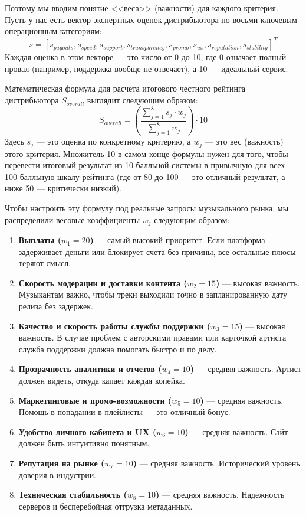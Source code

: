 \documentclass[14pt, a4paper]{extarticle}
\begin{document}
Поэтому мы вводим понятие <<веса>> (важности) для каждого критерия. Пусть у нас есть вектор экспертных оценок дистрибьютора по восьми ключевым операционным категориям:
\begin{equation}\label{scores_vector_simple}
s = [s_{payouts}, s_{speed}, s_{support}, s_{transparency}, s_{promo}, s_{ux}, s_{reputation}, s_{stability}]^T
\end{equation}
Каждая оценка в этом векторе — это число от 0 до 10, где 0 означает полный провал (например, поддержка вообще не отвечает), а 10 — идеальный сервис.

Математическая формула для расчета итогового честного рейтинга дистрибьютора $S_{overall}$ выглядит следующим образом:
\begin{equation}\label{additive_convolution_simple}
S_{overall} = \left( \frac{\sum_{j=1}^{8} s_j \cdot w_j}{\sum_{j=1}^{8} w_j} \right) \cdot 10
\end{equation}
Здесь $s_j$ — это оценка по конкретному критерию, а $w_j$ — это вес (важность) этого критерия. Множитель 10 в самом конце формулы нужен для того, чтобы перевести итоговый результат из 10-балльной системы в привычную для всех 100-балльную шкалу рейтинга (где от 80 до 100 — это отличный результат, а ниже 50 — критически низкий).

Чтобы настроить эту формулу под реальные запросы музыкального рынка, мы распределили весовые коэффициенты $w_j$ следующим образом:
\begin{enumerate}
    \item \textbf{Выплаты ($w_1 = 20$)} — самый высокий приоритет. Если платформа задерживает деньги или блокирует счета без причины, все остальные плюсы теряют смысл.
    \item \textbf{Скорость модерации и доставки контента ($w_2 = 15$)} — высокая важность. Музыкантам важно, чтобы треки выходили точно в запланированную дату релиза без задержек.
    \item \textbf{Качество и скорость работы службы поддержки ($w_3 = 15$)} — высокая важность. В случае проблем с авторскими правами или карточкой артиста служба поддержки должна помогать быстро и по делу.
    \item \textbf{Прозрачность аналитики и отчетов ($w_4 = 10$)} — средняя важность. Артист должен видеть, откуда капает каждая копейка.
    \item \textbf{Маркетинговые и промо-возможности ($w_5 = 10$)} — средняя важность. Помощь в попадании в плейлисты — это отличный бонус.
    \item \textbf{Удобство личного кабинета и UX ($w_6 = 10$)} — средняя важность. Сайт должен быть интуитивно понятным.
    \item \textbf{Репутация на рынке ($w_7 = 10$)} — средняя важность. Исторический уровень доверия в индустрии.
    \item \textbf{Техническая стабильность ($w_8 = 10$)} — средняя важность. Надежность серверов и бесперебойная отгрузка метаданных.
\end{enumerate}
\end{document}
